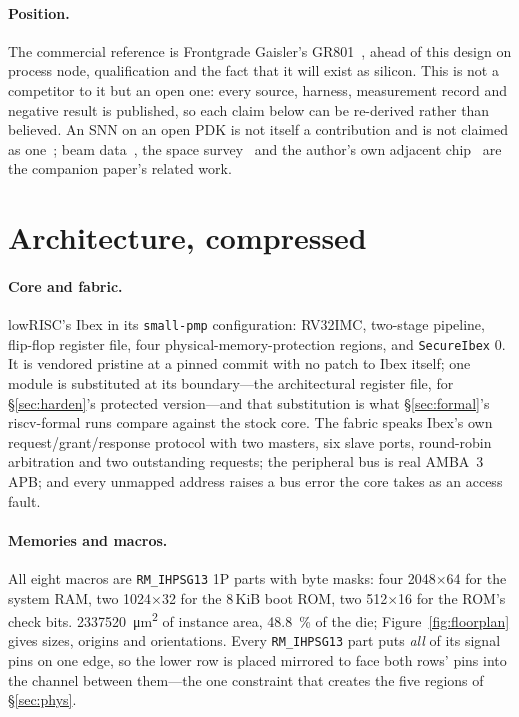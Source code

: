 \documentclass[11pt,a4paper]{article}
\newcommand{\file}[1]{\texttt{\small #1}}
\begin{document}
\paragraph{Position.} The commercial reference is Frontgrade Gaisler's
GR801~\cite{gr801}, ahead of this design on process node, qualification
and the fact that it will exist as silicon. This is not a competitor to
it but an open one: every source, harness, measurement record and
negative result is published, so each claim below can be re-derived
rather than believed. An SNN on an open PDK is not itself a
contribution and is not claimed as
one~\cite{openspike2023,kumaresan2026}; beam
data~\cite{nijsink2026,frenkel2019}, the space
survey~\cite{naoukin2023} and the author's own adjacent
chip~\cite{zirh2_2026} are the companion paper's related work.

\section{Architecture, compressed}
\label{sec:arch}

\paragraph{Core and fabric.} lowRISC's Ibex in its \texttt{small-pmp}
configuration: RV32IMC, two-stage pipeline, flip-flop register file,
four physical-memory-protection regions, and \texttt{SecureIbex}
\num{0}. It is vendored pristine at a pinned commit with no patch to
Ibex itself; one module is substituted at its boundary---the
architectural register file, for \S\ref{sec:harden}'s protected
version---and that substitution is what \S\ref{sec:formal}'s
riscv-formal runs compare against the stock core. The fabric speaks
Ibex's own request/grant/response protocol with two masters, six slave
ports, round-robin arbitration and two outstanding requests; the
peripheral bus is real AMBA~3 APB; and every unmapped address raises a
bus error the core takes as an access fault.

\paragraph{Memories and macros.} All eight macros are \file{RM\_IHPSG13}
1P parts with byte masks: four \num{2048}$\times$\num{64} for the
system RAM, two \num{1024}$\times$\num{32} for the \num{8}\,KiB boot
ROM, two \num{512}$\times$\num{16} for the ROM's check bits.
\SI{2337520}{\um\squared} of instance area,
\SI{48.8}{\percent} of the die; Figure~\ref{fig:floorplan} gives sizes,
origins and orientations. Every \file{RM\_IHPSG13} part puts \emph{all}
of its signal pins on one edge, so the lower row is placed mirrored to
face both rows' pins into the channel between them---the one constraint
that creates the five regions of \S\ref{sec:phys}.
\end{document}
